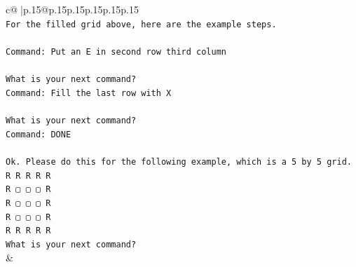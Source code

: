 \documentclass{article}
\begin{document}
{\begin{supertabular}{c@{$\;$}|p{.15\linewidth}@{}p{.15\linewidth}p{.15\linewidth}p{.15\linewidth}p{.15\linewidth}p{.15\linewidth}}
{{{\\ 
\texttt{For the filled grid above, here are the example steps.} \\
\\ 
\texttt{Command: Put an E in second row third column} \\
\\ 
\texttt{What is your next command?} \\
\texttt{Command: Fill the last row with X} \\
\\ 
\texttt{What is your next command?} \\
\texttt{Command: DONE} \\
\\ 
\texttt{Ok. Please do this for the following example, which is a 5 by 5 grid.} \\
\texttt{R R R R R} \\
\texttt{R ▢ ▢ ▢ R} \\
\texttt{R ▢ ▢ ▢ R} \\
\texttt{R ▢ ▢ ▢ R} \\
\texttt{R R R R R} \\
\texttt{What is your next command?} \\
            }
        }
    }
    & \\ \\


\end{supertabular}}
\end{document}
